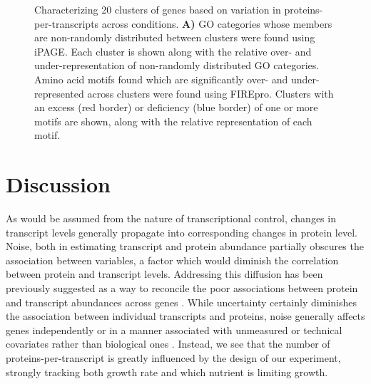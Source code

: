 \begin{figure}[h!]
\begin{center}
\hspace{1mm}
\caption[Characterizing 20 clusters of genes based on variation in proteins-per-transcripts across conditions]{Characterizing 20 clusters of genes based on variation in proteins-per-transcripts across conditions. \textbf{A)} GO categories whose members are non-randomly distributed between clusters were found using iPAGE. Each cluster is shown along with the relative over- and under-representation of non-randomly distributed GO categories. Amino acid motifs found which are significantly over- and under-represented across clusters were found using FIREpro. Clusters with an excess (red border) or deficiency (blue border) of one or more motifs are shown, along with the relative representation of each motif. }
\label{ch-pta:fire_page}
\end{center}
\end{figure}


\section{Discussion}

As would be assumed from the nature of transcriptional control, changes in transcript levels generally propagate into corresponding changes in protein level.  Noise, both in estimating transcript and protein abundance partially obscures the association between variables, a factor which would diminish the correlation between protein and transcript levels. Addressing this diffusion has been previously suggested as a way to reconcile the poor associations between protein and transcript abundances across genes \cite{Csardi:2015kx}.  While uncertainty certainly diminishes the association between individual transcripts and proteins, noise generally affects genes independently or in a manner associated with unmeasured or technical covariates rather than biological ones \cite{Leek:2007kn}. Instead, we see that the number of proteins-per-transcript is greatly influenced by the design of our experiment, strongly tracking both growth rate and which nutrient is limiting growth.

